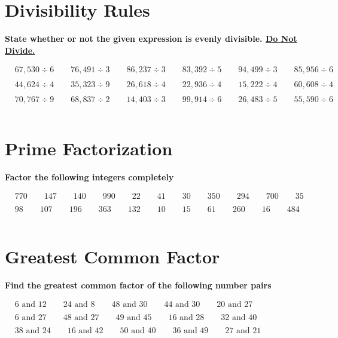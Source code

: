 \documentclass{article}
\begin{document}
\section{Divisibility Rules}
\textbf{State whether or not the given expression is evenly divisible. \underline{Do Not Divide.}}
\bigskip

\(\begin{aligned}
	&67,530 \div 6 \qquad 76,491 \div 3 \qquad 86,237 \div 3 \qquad 83,392 \div 5 \qquad 94,499 \div 3 \qquad 85,956 \div 6\\\\
	&44,624 \div 4 \qquad 35,323 \div 9 \qquad 26,618 \div 4 \qquad 22,936 \div 4 \qquad 15,222 \div 4 \qquad 60,608 \div 4\\\\
	&70,767 \div 9 \qquad 68,837 \div 2 \qquad 14,403 \div 3 \qquad 99,914 \div 6 \qquad 26,483 \div 5 \qquad 55,590 \div 6\\\\
\end{aligned}\)

\section{Prime Factorization}
\textbf{Factor the following integers completely}
\bigskip

\(\begin{aligned}
	&770 \qquad 147 \qquad 140 \qquad 990 \qquad 22 \qquad 41 \qquad 30 \qquad 350 \qquad 294 \qquad 700 \qquad 35\\\\
	&98 \qquad 107 \qquad 196 \qquad 363 \qquad 132 \qquad 10 \qquad 15 \qquad 61 \qquad 260 \qquad 16 \qquad 484 \\\\
\end{aligned}\)

\section{Greatest Common Factor}
\textbf{Find the greatest common factor of the following number pairs}
\bigskip

\(\begin{aligned}
	&6\text{ and }12 \qquad 24\text{ and }8 \qquad 48\text{ and }30 \qquad 44\text{ and }30 \qquad 20\text{ and }27 \\\\
	&6\text{ and }27 \qquad 48\text{ and }27 \qquad 49\text{ and }45 \qquad 16 \text{ and }28  \qquad  32\text{ and }40 \\\\
	&38\text{ and }24 \qquad 16\text{ and }42 \qquad 50\text{ and }40 \qquad 36\text{ and }49  \qquad  27\text{ and }21 \\\\
\end{aligned}\)
\end{document}
